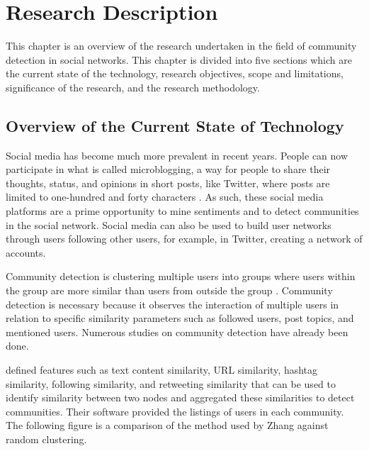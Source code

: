 %
%
%                 




\chapter{Research Description}
\label{sec:researchdesc}




This chapter is an overview of the research undertaken in the field of community detection in social networks. 
This chapter is divided into five sections which are the current state of the technology, research objectives, scope and limitations, significance of the research, and the research methodology.




\section{Overview of the Current State of Technology}
\label{sec:overview}


Social media has become much more prevalent in recent years. People can now participate in what is called microblogging, a way for people to share their thoughts, status, and opinions in short posts, like Twitter, where posts are limited to one-hundred and forty characters \cite{Java:2007}. As such, these social media platforms are a prime opportunity to mine sentiments and to detect communities in the social network. Social media can also be used to build user networks through users following other users, for example, in Twitter, creating a network of accounts.




Community detection is clustering multiple users into groups where users within the group are more similar than users from outside the group \cite{Tang:2010}. Community detection is necessary because it observes the interaction of multiple users in relation to specific similarity parameters such as followed users, post topics, and mentioned users. Numerous studies on community detection have already been done. 


 defined features such as text content similarity, URL similarity, hashtag similarity, following similarity, and retweeting similarity that can be used to identify similarity between two nodes and aggregated these similarities to detect communities. Their software provided the listings of users in each community. The following figure is a comparison of the method used by Zhang against random clustering.



